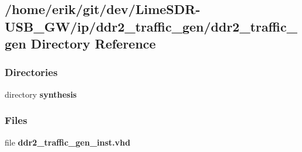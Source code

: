 \subsection{/home/erik/git/dev/\+Lime\+S\+D\+R-\/\+U\+S\+B\+\_\+\+G\+W/ip/ddr2\+\_\+traffic\+\_\+gen/ddr2\+\_\+traffic\+\_\+gen Directory Reference}
\label{dir_ba082c59fe7f85dd6695fda540b16468}
\subsubsection*{Directories}
\begin{DoxyCompactItemize}
\item 
directory {\bf synthesis}
\end{DoxyCompactItemize}
\subsubsection*{Files}
\begin{DoxyCompactItemize}
\item 
file {\bf ddr2\+\_\+traffic\+\_\+gen\+\_\+inst.\+vhd}
\end{DoxyCompactItemize}
